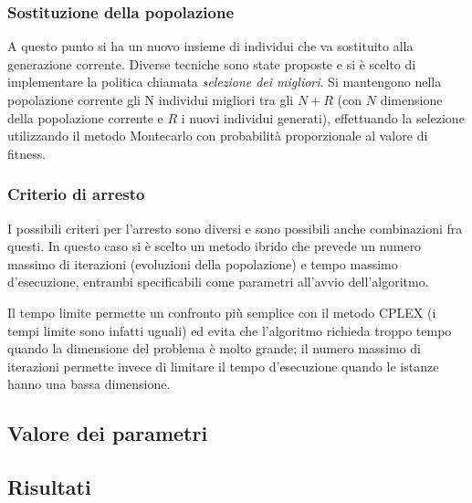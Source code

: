 \subsubsection{Sostituzione della popolazione}\label{subsubsec:sostituzione-popolazione}
A questo punto si ha un nuovo insieme di individui che va sostituito alla generazione corrente.
Diverse tecniche sono state proposte e si è scelto di implementare la politica chiamata \textit{selezione dei migliori}.
Si mantengono nella popolazione corrente gli N individui migliori tra gli $N + R$ (con $N$ dimensione della popolazione corrente
e $R$ i nuovi individui generati), effettuando la selezione utilizzando il metodo Montecarlo con probabilità
proporzionale al valore di fitness.
\subsubsection{Criterio di arresto}\label{subsubsec:criterio-arresto}
I possibili criteri per l'arresto sono diversi e sono possibili anche combinazioni fra questi.
In questo caso si è scelto un metodo ibrido che prevede un numero massimo di iterazioni (evoluzioni
della popolazione) e tempo massimo d'esecuzione, entrambi specificabili come parametri all'avvio dell'algoritmo.

Il tempo limite permette un confronto più semplice con il metodo CPLEX (i tempi limite sono infatti uguali)
ed evita che l'algoritmo richieda troppo tempo quando la dimensione del problema è molto grande;
il numero massimo di iterazioni permette invece di limitare il tempo d'esecuzione
quando le istanze hanno una bassa dimensione.
\subsection{Valore dei parametri}\label{subsec:parametri}
\subsection{Risultati}\label{subsec:risultati}
